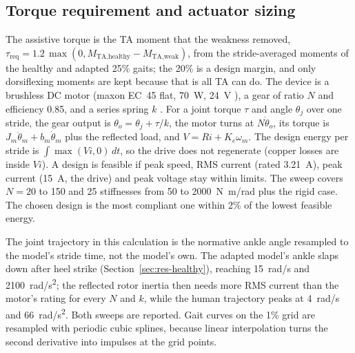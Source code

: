 \subsection{Torque requirement and actuator sizing}
The assistive torque is the TA moment that the weakness removed, $\tau_\text{req} = 1.2\,\max(0, M_\text{TA,healthy} - M_\text{TA,weak})$, from the stride-averaged moments of the healthy and adapted 25\% gaits; the 20\% is a design margin, and only dorsiflexing moments are kept because that is all TA can do. The device is a brushless DC motor (maxon EC~45 flat, \SI{70}{W}, \SI{24}{V} \cite{maxon411812}), a gear of ratio $N$ and efficiency 0.85, and a series spring $k$ \cite{pratt1995}. For a joint torque $\tau$ and angle $\theta_j$ over one stride, the gear output is $\theta_o = \theta_j + \tau/k$, the motor turns at $N\dot\theta_o$, its torque is $J_m\ddot\theta_m + b_m\dot\theta_m$ plus the reflected load, and $V = Ri + K_e\omega_m$. The design energy per stride is $\int \max(Vi, 0)\,dt$, so the drive does not regenerate (copper losses are inside $Vi$). A design is feasible if peak speed, RMS current (rated \SI{3.21}{A}), peak current (\SI{15}{A}, the drive) and peak voltage stay within limits. The sweep covers $N = 20$ to 150 and 25 stiffnesses from 50 to \SI{2000}{N.m/rad} plus the rigid case. The chosen design is the most compliant one within 2\% of the lowest feasible energy.

The joint trajectory in this calculation is the normative ankle angle \cite{camargo2021} resampled to the model's stride time, not the model's own. The adapted model's ankle slaps down after heel strike (Section~\ref{sec:res-healthy}), reaching \SI{15}{rad/s} and \SI{2100}{rad/s^2}; the reflected rotor inertia then needs more RMS current than the motor's rating for every $N$ and $k$, while the human trajectory peaks at \SI{4}{rad/s} and \SI{66}{rad/s^2}. Both sweeps are reported. Gait curves on the 1\% grid are resampled with periodic cubic splines, because linear interpolation turns the second derivative into impulses at the grid points.

